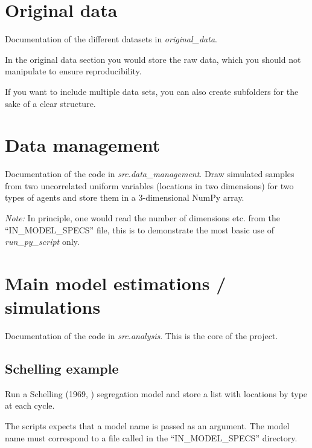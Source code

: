 \documentclass[a4paper,11pt,english]{sphinxmanual}
\begin{document}
\chapter{Original data}
\label{original_data:original-data}\label{original_data::doc}\label{original_data:id1}
Documentation of the different datasets in \emph{original\_data}.

In the original data section you would store the raw data, which you should not manipulate to ensure reproducibility.

If you want to include multiple data sets, you can also create subfolders for the sake of a clear structure.


\chapter{Data management}
\label{data_management:data-management}\label{data_management::doc}\label{data_management:id1}
Documentation of the code in \emph{src.data\_management}.
\label{data_management:module-src.data_management.get_simulation_draws}
Draw simulated samples from two uncorrelated uniform variables
(locations in two dimensions) for two types of agents and store
them in a 3-dimensional NumPy array.

\emph{Note:} In principle, one would read the number of dimensions etc.
from the ``IN\_MODEL\_SPECS'' file, this is to demonstrate the most basic
use of \emph{run\_py\_script} only.


\chapter{Main model estimations / simulations}
\label{analysis:analysis}\label{analysis::doc}\label{analysis:main-model-estimations-simulations}
Documentation of the code in \emph{src.analysis}. This is the core of the project.


\section{Schelling example}
\label{analysis:schelling-example}\label{analysis:module-src.analysis.schelling}
Run a Schelling (1969, \label{analysis:id1}{\hyperref[references:schelling69]{\sphinxcrossref{{[}1{]}}}}) segregation
model and store a list with locations by type at each cycle.

The scripts expects that a model name is passed as an
argument. The model name must correspond to a file called
 in the ``IN\_MODEL\_SPECS'' directory.
\end{document}
